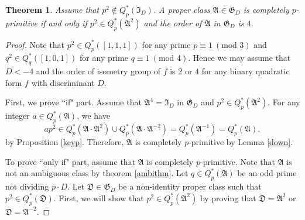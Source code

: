 \documentclass{amsart}
\newtheorem{thm}{Theorem}[section]
\theoremstyle{definition}
\theoremstyle{remark}
\numberwithin{equation}{section}
\begin{document}
\begin{thm} \label{classification} Assume that $p^2 \not \in Q_p^*(\mathfrak I_D)$. A proper class $\mathfrak A \in \mathfrak G_D$ is completely $p$-primitive if and only if  $p^2 \in Q_p^*(\mathfrak A^2)$ and the order of $\mathfrak A$ in $\mathfrak G_D$ is $4$. 
\end{thm}

\begin{proof} Note that $p^2 \in Q_p^*([1,1,1])$ for any prime $p \equiv 1 \ (\text{mod } 3)$ and $q^2 \in Q_q^*([1,0,1])$ for any prime $q \equiv 1 \ (\text{mod } 4)$. Hence we may assume that $D<-4$ and the order of isometry group of $f$ is $2$  or $4$ for any binary quadratic form $f$ with discriminant $D$.  

First, we prove ``if" part. Assume that  $\mathfrak A^4=\mathfrak I_D$ in $\mathfrak G_D$  and $p^2 \in Q_p^*(\mathfrak A^2)$. 
For any integer $a \in Q_p^*(\mathfrak A)$,  we have
$$
ap^2 \in Q_p^*(\mathfrak A\cdot \mathfrak A^2) \cup Q_p^*(\mathfrak A\cdot \mathfrak A^{-2})=Q_p^*(\mathfrak A^{-1})= Q_p^*(\mathfrak A),
$$
by Proposition \ref{keyp}.  Therefore, $\mathfrak A$ is completely $p$-primitive by Lemma \ref{down}.

To prove ``only if" part, assume that $\mathfrak A$ is completely $p$-primitive. Note that $\mathfrak A$ is not an ambiguous class by theorem \ref{ambithm}.  Let $q \in Q_p^*(\mathfrak A)$ be an odd prime not dividing $p\cdot D$.  Let $\mathfrak D \in \mathfrak G_D$  be a non-identity proper class such that $p^2 \in Q_p^*(\mathfrak D)$. First, we will show that $p^2 \in Q_p^*(\mathfrak A^2)$ by proving that $\mathfrak D=\mathfrak A^2$ or $\mathfrak D=\mathfrak A^{-2}$. 


\end{proof}
\end{document}
